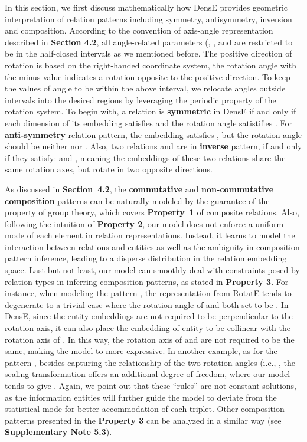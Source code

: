 \documentclass[11pt]{article}
\begin{document}
In this section, we first discuss mathematically how DensE provides geometric interpretation of relation patterns including symmetry, antisymmetry, inversion and composition. According to the convention of axis-angle representation described in \textbf{Section 4.2}, all angle-related parameters (, , and  are restricted to be in the half-closed intervals as we mentioned before. The positive direction of rotation is based on the right-handed coordinate system, the rotation angle with the minus value indicates a rotation opposite to the positive direction. To keep the values of angle to be within the above interval, we relocate angles outside intervals into the desired regions by leveraging the periodic property of the rotation system.   
To begin with, a relation  is \textbf{symmetric} in DensE if and only if each dimension of its embedding  satisfies  and the rotation angle satistifies . 
For \textbf{anti-symmetry} relation pattern, the embedding  satisfies  , but the rotation angle  should be neither  nor .
Also, two relations  and  are in \textbf{inverse} pattern, if and only if they satisfy:  and , meaning the embeddings of these two relations share the same rotation axes, but rotate in two opposite directions.


As discussed in \textbf{Section~4.2}, the \textbf{commutative} and \textbf{non-commutative composition} patterns can be naturally modeled by the guarantee of the property of group theory, which covers \textbf{Property~1} of composite relations. Also, following the intuition of \textbf{Property 2}, our model does not enforce a uniform mode of each element in relation representations. Instead, it learns to model the interaction between relations and entities as well as the ambiguity in composition pattern inference, leading to a disperse distribution in the relation embedding space. Last but not least, our model can smoothly deal with constraints posed by relation types in inferring composition patterns, as stated in \textbf{Property 3}. For instance, when modeling the pattern , the representation from RotatE tends to degenerate to a trivial case where the rotation angle of  and  both set to be . In DensE, since the entity embeddings are not required to be perpendicular to the rotation axis, it can also place the embedding of entity  to be collinear with the rotation axis of . In this way, the rotation axis of  and  are not required to be the same, making the model to more expressive.  In another example, as for the pattern , besides capturing the relationship of the two rotation angles (i.e., , the scaling transformation offers an additional degree of freedom, where our model tends to give . Again, we point out that these ``rules'' are not constant solutions, as the information entities will further guide the model to deviate from the statistical mode for better accommodation of each triplet. Other composition patterns presented in the \textbf{Property 3} can be analyzed in a similar way (see \textbf{Supplementary Note 5.3}).
\end{document}
